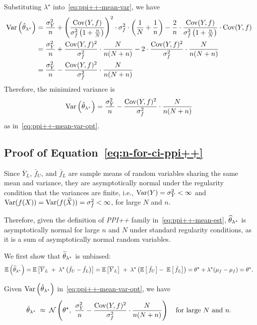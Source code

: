 \noindent
Substituting $\lambda^\star$ into~\eqref{eq:ppi++-mean-var}, we have\begin{align*}
    \mathrm{Var}\left(\hat{\theta}_{\lambda^\star}\right)
    &=\frac{\sigma^2_Y}{n}
    +\left(\frac{\mathrm{Cov}(Y,f)}{\sigma_f^2\left(1+\frac{n}{N}\right)}\right)^2\cdot\sigma_f^2\cdot\left(\frac{1}{N}+\frac{1}{n}\right)
    -\frac{2}{n}\cdot\frac{\mathrm{Cov}(Y,f)}{\sigma_f^2\left(1+\frac{n}{N}\right)}\cdot\mathrm{Cov}(Y,f)\\
    &=\frac{\sigma^2_Y}{n}+\frac{\mathrm{Cov}(Y,f)^2}{\sigma_f^2}\cdot\frac{N}{n(N+n)}-2\cdot \frac{\mathrm{Cov}(Y,f)^2}{\sigma_f^2}\cdot\frac{N}{n(N+n)}\\
    &=\frac{\sigma^2_Y}{n}-\frac{\mathrm{Cov}(Y,f)^2}{\sigma_f^2}\cdot\frac{N}{n(N+n)}
\end{align*}
Therefore, the minimized variance is \[\mathrm{Var}\left(\hat{\theta}_{\lambda^\star}\right)=\frac{\sigma^2_Y}{n}-\frac{\mathrm{Cov}(Y,f)^2}{\sigma_f^2}\cdot\frac{N}{n(N+n)}\]as in~\eqref{eq:ppi++-mean-var-opt}.

\subsection{Proof of Equation~\eqref{eq:n-for-ci-ppi++}}
Since $\overline{Y}_L$, $\bar f_U$, and $\bar f_L$ are sample means of random variables sharing the same mean and variance, they are asymptotically normal under the regularity condition that the variances are finite, i.e., $\mathrm{Var}(Y)=\sigma_Y^2<\infty$ and $\mathrm{Var}(f(X))=\mathrm{Var}(f(\widetilde X))=\sigma_f^2<\infty$, for large $N$ and $n$.

\noindent
Therefore, given the definition of \emph{PPI++} family in~\eqref{eq:ppi++-mean-est}, $\widehat{\theta}_{\lambda^\star}$ is asymptotically normal for large $n$ and $N$ under standard regularity conditions, as it is a sum of asymptotically normal random variables.

\noindent
We first show that $\widetilde{\theta}_{\lambda^\star}$ is unbiased:\[\mathbb{E}\left(\widehat{\theta}_{\lambda^\star}\right)
=\mathbb{E}\left[\overline Y_L \;+\; \lambda^\star\,\big(\bar f_U - \bar f_L\big)\right]
=\mathbb{E}\left[\overline Y_L\right] \;+\; \lambda^\star\left(\mathbb{E}\left[\,\bar f_U\right]-\; \mathbb{E}\left[\,\bar f_L\right]\right)
=\theta^\star+\lambda^\star(\mu_f-\mu_f)=\theta^\star.
\]

\noindent
Given $\mathrm{Var}\left(\hat{\theta}_{\lambda^\star}\right)$ in~\eqref{eq:ppi++-mean-var-opt}, we have \[
\hat{\theta}_{\lambda^\star}\;\approx\;\mathcal{N}\left(\theta^\star,\ \frac{\sigma^2_Y}{n}-\frac{\Cov(Y,f)^2}{\sigma_f^2}\cdot\frac{N}{n(N+n)}\right)\quad\text{for large $N$ and $n$}.
\]

